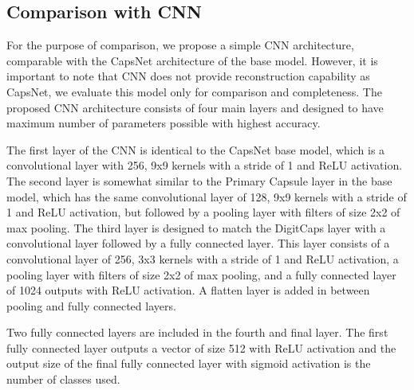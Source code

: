 \subsection{Comparison with CNN}
For the purpose of comparison, we propose a simple CNN architecture, comparable with the CapsNet architecture of the base model. However, it is important to note that CNN does not provide reconstruction capability as CapsNet, we evaluate this model only for comparison and completeness. The proposed CNN architecture consists of four main layers and designed to have maximum number of parameters possible with highest accuracy.

The first layer of the CNN is identical to the CapsNet base model, which is a convolutional layer with 256, 9x9 kernels with a stride of 1 and ReLU activation. The second layer is somewhat similar to the Primary Capsule layer in the base model, which has the same convolutional layer of 128, 9x9 kernels with a stride of 1 and ReLU activation, but followed by a pooling layer with filters of size 2x2 of max pooling. The third layer is designed to match the DigitCaps layer with a convolutional layer followed by a fully connected layer. This layer consists of a convolutional layer of 256, 3x3 kernels with a stride of 1 and ReLU activation, a pooling layer with filters of size 2x2 of max pooling, and a fully connected layer of 1024 outputs with ReLU activation. A flatten layer is added in between pooling and fully connected layers. 

Two fully connected layers are included in the fourth and final layer. The first fully connected layer outputs a vector of size 512 with ReLU activation and the output size of the final fully connected layer with sigmoid activation is the number of classes used. 